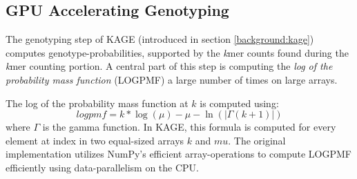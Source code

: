 \subsection{GPU Accelerating Genotyping} \label{methods:gpu_accelerating_genotyping}
The genotyping step of KAGE (introduced in section \ref{background:kage}) computes genotype-probabilities, supported by the \textit{k}mer counts found during the \textit{k}mer counting portion.
A central part of this step is computing the \textit{log of the probability mass function} (LOGPMF) a large number of times on large arrays.

The log of the probability mass function at $k$ is computed using:
\begin{equation}
  logpmf = k * \log(\mu) - \mu - \ln(|\Gamma(k + 1)|)
\end{equation}
where $\Gamma$ is the gamma function.
In KAGE, this formula is computed for every element at index in two equal-sized arrays $k$ and $mu$.
The original implementation utilizes NumPy's efficient array-operations to compute LOGPMF efficiently using data-parallelism on the CPU.

